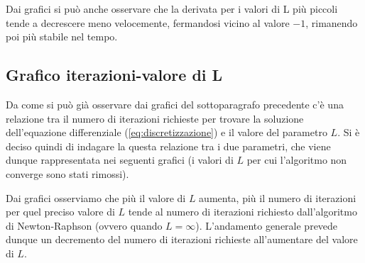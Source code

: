 			\graficospace
			\graficospace
			\graficospace
			
			Dai grafici si può anche osservare che la derivata per i valori di L più piccoli tende a decrescere meno velocemente, fermandosi vicino al valore $-1$, rimanendo poi più stabile nel tempo.
			\pagebreak
			
		\subsection{Grafico iterazioni-valore di L}
			Da come si può già osservare dai grafici del sottoparagrafo precedente c'è una relazione tra il numero di iterazioni richieste per trovare la soluzione dell'equazione differenziale (\ref{eq:discretizzazione}) e il valore del parametro $L$. Si è deciso quindi di indagare la questa relazione tra i due parametri, che viene dunque rappresentata nei seguenti grafici (i valori di $L$ per cui l'algoritmo non converge sono stati rimossi).
			
			\graficospace
			\graficospace
			\graficospace
			\graficospace
			\graficospace
			\graficospace
			
			Dai grafici osserviamo che più il valore di $L$ aumenta, più il numero di iterazioni per quel preciso valore di $L$ tende al numero di iterazioni richiesto dall'algoritmo di Newton-Raphson (ovvero quando $L = \infty$). L'andamento generale prevede dunque un decremento del numero di iterazioni richieste all'aumentare del valore di $L$.
			
